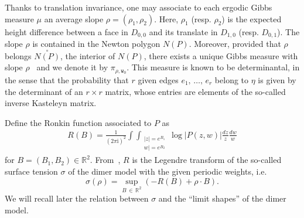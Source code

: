 \documentclass[AHL,Unicode,longabstracts,published]{cedram}
\newcommand{\ttw}{\mathtt{w}}
\newcommand{\bbR}{\mathbb{R}}
\newcommand{\rmi}{\mathrm{i}}
\newcommand{\ttw}{\mathtt{w}}
\begin{document}
Thanks to translation invariance, one may associate to each ergodic Gibbs measure $\mu$ an average slope $\rho=(\rho_1,\rho_2)$. Here, $\rho_1$ (resp. $\rho_2$) is the expected height difference between a face in $D_{0,0}$ and its translate in $D_{1,0}$ (resp. $D_{0,1}$). The slope $\rho$ is contained in the Newton polygon $N(P)$. Moreover, provided that $\rho$ belongs $\overset{\circ}{N(P)}$, the interior of $N(P)$, there exists a unique Gibbs measure with slope $\rho$~\cite{KOS03} and we denote it by $\pi_{\rho,\ttw_0}$. This measure is known to be determinantal, in the sense that the probability that $r$ given edges $e_1,\,\dots,\,e_r$ belong to $\eta$ is given by the determinant of an $r\times r$ matrix, whose entries are elements of the so-called inverse Kasteleyn matrix.

Define the Ronkin function associated to $P$ as
\begin{align}\label{eq:Ronkin}
R(B)= \frac{1}{(2\pi \rmi)^2} \int \int_{\substack{ |z|=e^{B_1} \\ 
w|=e^{B_2}}} \log |P(z,w)| \frac{dz}{z} \frac{dw}{w}
\end{align}
for $B=(B_1,B_2)\in\bbR^2$. From~\cite{KOS03}, $R$ is the Legendre transform of the so-called surface tension $\sigma$ of the dimer model with the given periodic weights, i.e.
\begin{equation}\label{eq:sigma}
\sigma(\rho)=\sup_{B\,\in\,\bbR^2}(-R(B)+\rho\cdot B).
\end{equation}
We will recall later the relation between $\sigma$ and the ``limit shapes'' of the dimer model.
\end{document}
